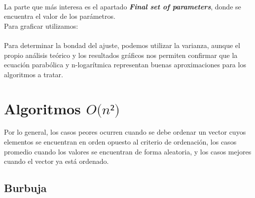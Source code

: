 \documentclass[a4paper,12pt,twoside]{article} %
\begin{document}
\\

La parte que más interesa es el apartado \textit{\textbf{Final set of parameters}}, donde se encuentra el valor de los parámetros.\\

Para graficar utilizamos:\\

\\

Para determinar la bondad del ajuste, podemos utilizar la varianza, aunque el propio análisis teórico y los resultados gráficos nos permiten confirmar que la ecuación parabólica y n-logarítmica representan buenas aproximaciones para los algoritmos a tratar.


\newpage

\section{Algoritmos $\textit{O(n²)}$}

Por lo general, los casos peores ocurren cuando se debe ordenar un vector cuyos elementos se encuentran en orden opuesto al criterio de ordenación, los casos promedio cuando los valores se encuentran de forma aleatoria, y los casos mejores cuando el vector ya está ordenado.

\subsection{Burbuja}
\end{document}
